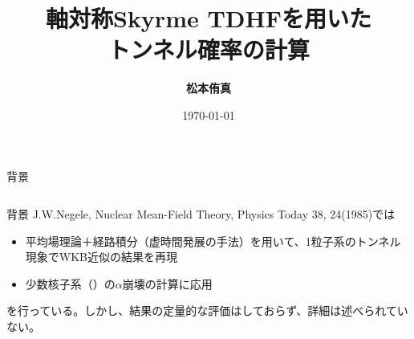 \documentclass[11pt,aspectratio=169,xcolor=dvipsnames,table,dvipdfmx]{beamer}
\title{軸対称Skyrme TDHFを用いた\\トンネル確率の計算}
\author{\textbf{松本侑真}}
\date{\today}
\institute{原子核理論 関澤研究室}
\theoremstyle{definition}
\begin{document}
\maketitle

\begin{frame}{背景}
  \begin{columns}[t]
    \begin{column}{.5\textwidth}
    \end{column}
  \end{columns}

\end{frame}


\begin{frame}{背景}
  J.W.Negele, Nuclear Mean-Field Theory, Physics Today 38, 24(1985)では
  \begin{itemize}
    \item 平均場理論＋経路積分（虚時間発展の手法）を用いて、1粒子系のトンネル現象でWKB近似の結果を再現
    \item 少数核子系（）の$\alpha$崩壊の計算に応用
  \end{itemize}
  を行っている。しかし、結果の定量的な評価はしておらず、詳細は述べられていない。
\end{frame}
\end{document}
